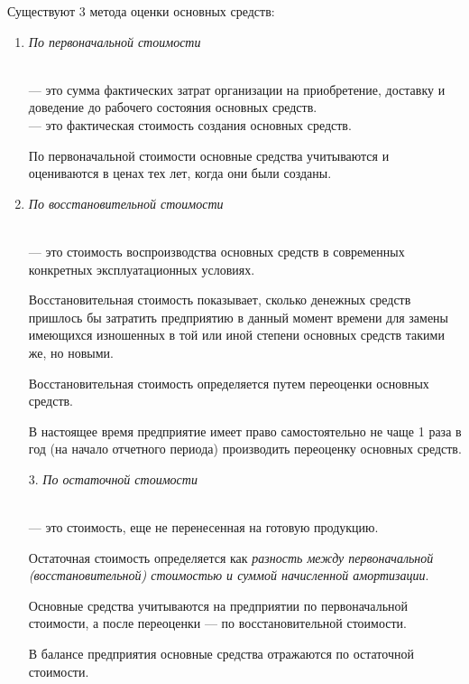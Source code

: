 Существуют 3 метода оценки основных средств:

\begin{enumerate}
    \item \textit{По первоначальной стоимости}

\begin{definition}
    \normalfont
    ~\\
     --- это сумма фактических затрат организации
    на приобретение, доставку и доведение до рабочего состояния основных
    средств.
    ~\\
     --- это фактическая стоимость создания основных средств.
\end{definition}

По первоначальной стоимости основные средства учитываются и оцениваются в ценах
тех лет, когда они были созданы.

\item \textit{По восстановительной стоимости}

\begin{definition}
    \normalfont
    ~\\
     --- это стоимость воспроизводства
    основных средств в современных конкретных эксплуатационных условиях.
\end{definition}

Восстановительная стоимость показывает, сколько денежных средств пришлось бы
затратить предприятию в данный момент времени для замены имеющихся изношенных в
той или иной степени основных средств такими же, но новыми.

Восстановительная стоимость определяется путем переоценки основных средств.

В настоящее время предприятие имеет право самостоятельно не чаще 1 раза в год
(на начало отчетного периода) производить переоценку основных средств.

3. \textit{По остаточной стоимости}

\begin{definition}
    \normalfont
    ~\\
     --- это стоимость, еще не перенесенная на
    готовую продукцию.
\end{definition}

Остаточная стоимость определяется как \textit{разность между первоначальной
(восстановительной) стоимостью и суммой начисленной амортизации}.

Основные средства учитываются на предприятии по первоначальной стоимости, а
после переоценки --- по восстановительной стоимости.

В балансе предприятия основные средства отражаются по остаточной стоимости.
\end{enumerate}

